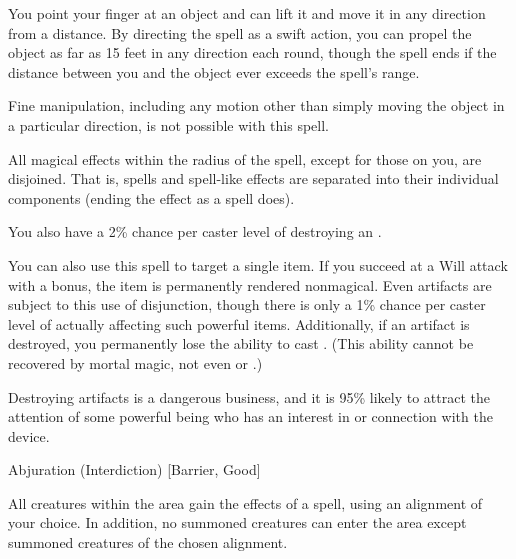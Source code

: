 \spellrng{\rngclose}
\spelldur{\durshort}
\begin{spelleffect}
  You point your finger at an object and can lift it and move it in any direction from a distance. By directing the spell as a swift action, you can propel the object as far as 15 feet in any direction each round, though the spell ends if the distance between you and the object ever exceeds the spell's range.
\end{spelleffect}
\begin{spellnotes}
  Fine manipulation, including any motion other than simply moving the object in a particular direction, is not possible with this spell.
\end{spellnotes}

\spellrng{\rngmed}
\begin{spelleffect}
  All magical effects within the radius of the spell, except for those on you, are disjoined. That is, spells and spell-like effects are separated into their individual components (ending the effect as a  spell does).
  \par You also have a 2\% chance per caster level of destroying an .
  \par You can also use this spell to target a single item. If you succeed at a Will attack with a  bonus, the item is permanently rendered nonmagical. Even artifacts are subject to this use of disjunction, though there is only a 1\% chance per caster level of actually affecting such powerful items. Additionally, if an artifact is destroyed, you permanently lose the ability to cast . (This ability cannot be recovered by mortal magic, not even  or .)
  \par {} Destroying artifacts is a dangerous business, and it is 95\% likely to attract the attention of some powerful being who has an interest in or connection with the device.
\end{spelleffect}

\par Abjuration (Interdiction) [Barrier, Good]
\begin{spelleffect}
    All creatures within the area gain the effects of a  spell, using an alignment of your choice. In addition, no summoned creatures can enter the area except summoned creatures of the chosen alignment.
\end{spelleffect}

